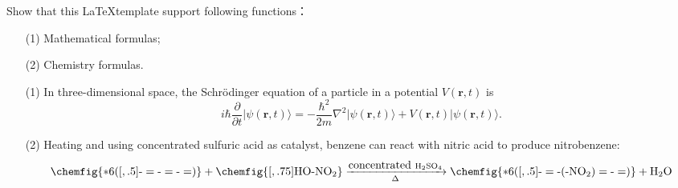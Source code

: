 \documentclass[en, twoside]{assignment}
\begin{document}
    \begin{prob}
        Show that this \LaTeX template support following functions：
        \begin{itemize}
            \item[(1)] Mathematical formulas;
            \item[(2)] Chemistry formulas.
        \end{itemize}
    \end{prob}
    \begin{pf}
        \begin{itemize}
            \item[(1)] In three-dimensional space, the Schrödinger equation of a particle in a potential $V(\bm{r},t)$ is
            \begin{equation}
                i\hbar\frac{\partial}{\partial t}\lvert\psi(\bm{r},t)\rangle=-\frac{\hbar^2}{2m}\nabla^2\lvert\psi(\bm{r},t)\rangle+V(\bm{r},t)\lvert\psi(\bm{r},t)\rangle.
            \end{equation}
            \item[(2)] Heating and using concentrated sulfuric acid as catalyst, benzene can react with nitric acid to produce nitrobenzene:
            \begin{equation}
                \ce{\chemfig{*6([,.5]-=-=-=)} + \chemfig{[,.75]HO-NO_2} ->[\mbox{concentrated }H2SO4][$\Delta$] \chemfig{*6([,.5]-=-(-NO_2)=-=)} + H2O}
            \end{equation}

\end{itemize}
\end{pf}
\end{document}
